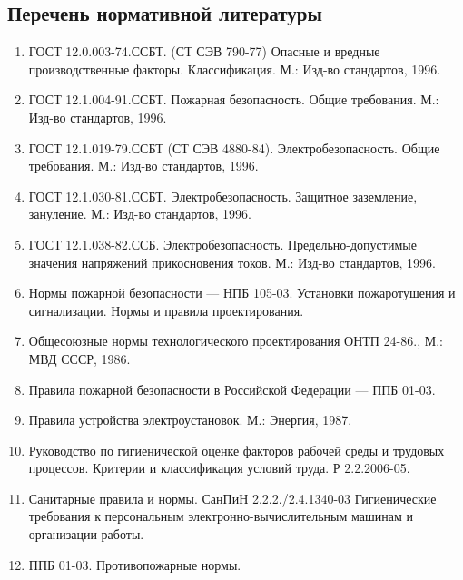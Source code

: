 \subsection{Перечень нормативной литературы}

\begin{enumerate}
  \item{ГОСТ 12.0.003-74.ССБТ. (СТ СЭВ 790-77) Опасные и вредные производственные факторы. Классификация. М.: Изд-во стандартов, 1996.}
  \item{ГОСТ 12.1.004-91.ССБТ. Пожарная безопасность. Общие требования. М.: Изд-во стандартов, 1996.}
  \item{ГОСТ 12.1.019-79.ССБТ (СТ СЭВ 4880-84). Электробезопасность. Общие требования. М.: Изд-во стандартов, 1996.}
  \item{ГОСТ 12.1.030-81.ССБТ. Электробезопасность. Защитное заземление, зануление. М.: Изд-во стандартов, 1996.}
  \item{ГОСТ 12.1.038-82.ССБ. Электробезопасность. Предельно-допустимые значения напряжений прикосновения токов. М.: Изд-во стандартов, 1996.}
  \item{Нормы пожарной безопасности --- НПБ 105-03. Установки пожаротушения и сигнализации. Нормы и правила проектирования.}
  \item{Общесоюзные нормы технологического проектирования ОНТП 24-86., М.: МВД СССР, 1986.}
  \item{Правила пожарной безопасности в Российской Федерации --- ППБ 01-03.}
  \item{Правила устройства электроустановок. М.: Энергия, 1987.}
  \item{Руководство по гигиенической оценке факторов рабочей среды и трудовых процессов. Критерии и классификация условий труда. Р 2.2.2006-05.}
  \item{Санитарные правила и нормы. СанПиН 2.2.2./2.4.1340-03 Гигиенические требования к персональным электронно-вычислительным машинам и организации работы.}
  \item{ППБ 01-03. Противопожарные нормы.}
\end{enumerate}
